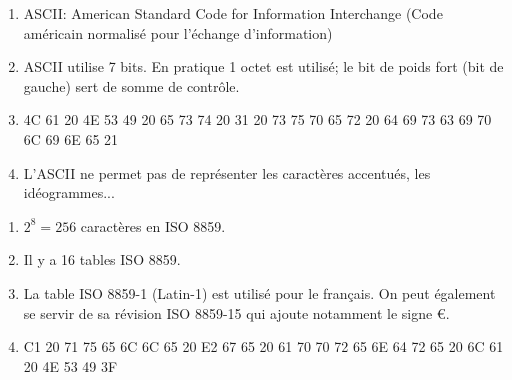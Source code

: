 \documentclass[a4paper,11pt]{article}
\begin{document}
\begin{Form}
\begin{activite}
\begin{enumerate}
\item ASCII: American Standard Code for Information Interchange (Code américain normalisé pour l'échange d'information)
\item ASCII utilise 7 bits. En pratique 1 octet est utilisé; le bit de poids fort (bit de gauche) sert de somme de contrôle.
\item 4C 61 20 4E 53 49 20 65 73 74 20 31 20 73 75 70 65 72 20 64 69 73 63 69 70 6C 69 6E 65 21
\item L'ASCII ne permet pas de représenter les caractères accentués, les idéogrammes...
\end{enumerate}
\end{activite}

\begin{activite}
\begin{enumerate}
\item $2^8 = 256$ caractères en ISO 8859.
\item Il y a 16 tables ISO 8859.
\item La table ISO 8859-1 (Latin-1) est utilisé pour le français. On peut également se servir de sa révision ISO 8859-15 qui ajoute notamment le signe €.
\item C1 20 71 75 65 6C 6C 65 20 E2 67 65 20 61 70 70 72 65 6E 64 72 65 20 6C 61 20 4E 53 49 3F
\end{enumerate}
\end{activite}


\end{Form}
\end{document}
